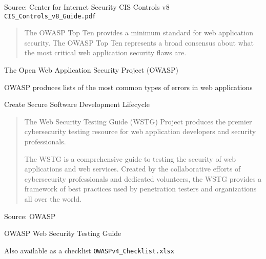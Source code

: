 \documentclass[Screen16to9,17pt]{foils}
\begin{document}
Source: Center for Internet Security CIS Controls v8 \verb+CIS_Controls_v8_Guide.pdf+






\begin{quote}
The OWASP Top Ten provides a minimum standard for web application
security. The OWASP Top Ten represents a broad consensus about what
the most critical web application security flaws are.
\end{quote}

\begin{list1}
\item The Open Web Application Security Project (OWASP)
\item OWASP produces lists of the most common types of errors in web applications
\item {}
\item Create Secure Software Development Lifecycle
\end{list1}





\begin{quote}
  The Web Security Testing Guide (WSTG) Project produces the premier cybersecurity testing resource for web application developers and security professionals.

  The WSTG is a comprehensive guide to testing the security of web applications and web services. Created by the collaborative efforts of cybersecurity professionals and dedicated volunteers, the WSTG provides a framework of best practices used by penetration testers and organizations all over the world.
\end{quote}
Source: OWASP

\begin{list2}
  \item OWASP Web Security Testing Guide\\
  \item Also available as a checklist \verb+OWASPv4_Checklist.xlsx+
\end{list2}




\end{document}

